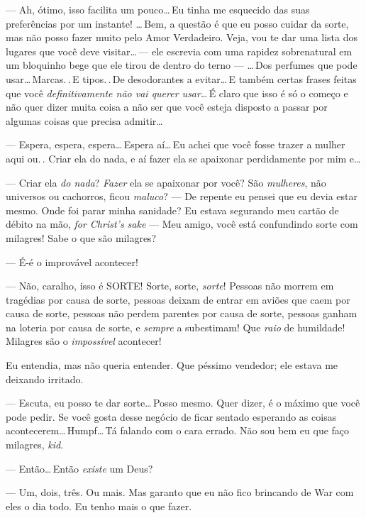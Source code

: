 --- Ah, ótimo, isso facilita um pouco\ldots\,Eu tinha me esquecido das suas preferências por um instante! \ldots\,Bem, a questão é que eu posso cuidar da sorte, mas não posso fazer muito pelo Amor Verdadeiro. Veja, vou te dar uma lista dos lugares que você deve visitar\ldots\,--- ele escrevia com uma rapidez sobrenatural em um bloquinho bege que ele tirou de dentro do terno ---  \ldots\,Dos perfumes que pode usar\ldots\,Marcas.\,.\,E tipos.\,.\,De desodorantes a evitar\ldots\,E também certas frases feitas que você \emph{definitivamente não vai querer usar}\ldots\,É claro que isso é só o começo e não quer dizer muita coisa a não ser que você esteja disposto a passar por algumas coisas que precisa admitir\ldots

--- Espera, espera, espera\ldots\,Espera aí\ldots\,Eu achei que você fosse trazer a mulher aqui ou.\,.\,\,Criar ela do nada, e aí fazer ela se apaixonar perdidamente por mim e\ldots

--- Criar ela \emph{do nada}? \emph{Fazer} ela se apaixonar por você? São \emph{mulheres}, não universos ou cachorros, ficou \emph{maluco}?  --- De repente eu pensei que eu devia estar mesmo. Onde foi parar minha sanidade? Eu estava segurando meu cartão de débito na mão, \foreignlanguage{english}{\emph{for Christ's sake}} --- Meu amigo, você está confundindo sorte com milagres! Sabe o que são milagres?

--- É-é o improvável acontecer!

--- Não, caralho, isso é SORTE! Sorte, sorte, \emph{sorte}! Pessoas não morrem em tragédias por causa de sorte, pessoas deixam de entrar em aviões que caem por causa de sorte, pessoas não perdem parentes por causa de sorte, pessoas ganham na loteria por causa de sorte, e \emph{sempre} a subestimam! Que \emph{raio} de humildade! Milagres são o \emph{impossível} acontecer!

Eu entendia, mas não queria entender. Que péssimo vendedor; ele estava me deixando irritado.

\begin{sloppypar}
--- Escuta, eu posso te dar sorte\ldots\,Posso mesmo. Quer dizer, é o máximo que você pode pedir. Se você gosta desse negócio de ficar sentado esperando as coisas acontecerem\ldots\,Hum\-pf\ldots\,Tá falando com o cara errado. Não sou bem eu que faço milagres, \emph{kid}.
\end{sloppypar}

--- Então\ldots\,Então \emph{existe} um Deus?

--- Um, dois, três. Ou mais. Mas garanto que eu não fico brincando de War com eles o dia todo. Eu tenho mais o que fazer.

